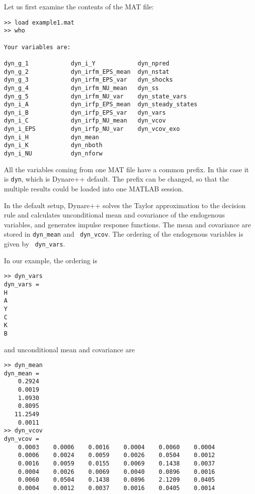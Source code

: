 \documentclass[10pt]{article}
\begin{document}
Let us first examine the contents of the MAT file:
{\small
\begin{verbatim}
>> load example1.mat
>> who

Your variables are:

dyn_g_1            dyn_i_Y            dyn_npred          
dyn_g_2            dyn_irfm_EPS_mean  dyn_nstat          
dyn_g_3            dyn_irfm_EPS_var   dyn_shocks         
dyn_g_4            dyn_irfm_NU_mean   dyn_ss             
dyn_g_5            dyn_irfm_NU_var    dyn_state_vars     
dyn_i_A            dyn_irfp_EPS_mean  dyn_steady_states  
dyn_i_B            dyn_irfp_EPS_var   dyn_vars           
dyn_i_C            dyn_irfp_NU_mean   dyn_vcov           
dyn_i_EPS          dyn_irfp_NU_var    dyn_vcov_exo       
dyn_i_H            dyn_mean           
dyn_i_K            dyn_nboth          
dyn_i_NU           dyn_nforw          
\end{verbatim}
}

All the variables coming from one MAT file have a common prefix. In
this case it is {\tt dyn}, which is Dynare++ default. The prefix can
be changed, so that the multiple results could be loaded into one MATLAB
session.

In the default setup, Dynare++ solves the Taylor approximation to the
decision rule and calculates unconditional mean and covariance of the
endogenous variables, and generates impulse response functions. The
mean and covariance are stored in {\tt dyn\_mean} and {\tt
dyn\_vcov}. The ordering of the endogenous variables is given by {\tt
dyn\_vars}.

In our example, the ordering is

{\small
\begin{verbatim}
>> dyn_vars
dyn_vars =
H
A
Y
C
K
B
\end{verbatim}
}

and unconditional mean and covariance are

{\small
\begin{verbatim}
>> dyn_mean
dyn_mean =
    0.2924
    0.0019
    1.0930
    0.8095
   11.2549
    0.0011
>> dyn_vcov
dyn_vcov =
    0.0003    0.0006    0.0016    0.0004    0.0060    0.0004
    0.0006    0.0024    0.0059    0.0026    0.0504    0.0012
    0.0016    0.0059    0.0155    0.0069    0.1438    0.0037
    0.0004    0.0026    0.0069    0.0040    0.0896    0.0016
    0.0060    0.0504    0.1438    0.0896    2.1209    0.0405
    0.0004    0.0012    0.0037    0.0016    0.0405    0.0014
\end{verbatim}
}
\end{document}
